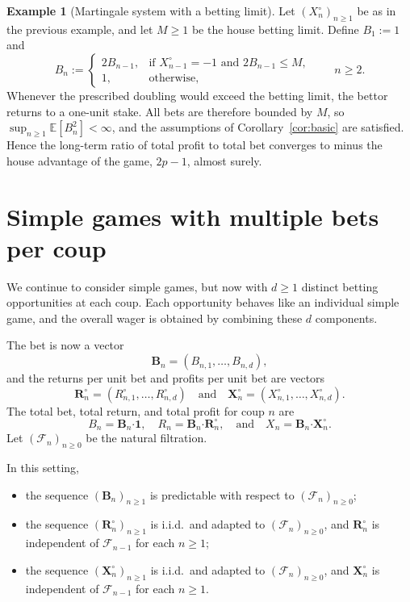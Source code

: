 \documentclass{article}
\theoremstyle{definition}
\newtheorem{example}[theorem]{Example}
\theoremstyle{remark}
\newcommand{\E}{\mathbb{E}}
\newcommand{\F}{\mathscr{F}}
\begin{document}
\begin{example}[Martingale system with a betting limit]
Let $(X_n^\circ)_{n\ge1}$ be as in the previous example, and let $M\ge1$ be the house betting limit.  
Define $B_1:=1$ and
\[
B_n:=
\begin{cases}
2B_{n-1}, &\text{if $X_{n-1}^\circ=-1$ and $2B_{n-1}\le M$},\\[2mm]
1,        &\text{otherwise},
\end{cases}
\qquad n\ge2.
\]
Whenever the prescribed doubling would exceed the betting limit, the bettor returns to a one-unit stake.  
All bets are therefore bounded by $M$, so $\sup_{n \ge 1} \E[B_n^2] < \infty$, and the assumptions of Corollary~\ref{cor:basic} are satisfied.  
Hence the long-term ratio of total profit to total bet converges to minus the house advantage of the game, $2p-1$, almost surely.
\end{example}





\section{Simple games with multiple bets per coup}\label{sec:simple-multiple}

We continue to consider simple games, but now with $d\ge1$ distinct betting opportunities at each coup.  
Each opportunity behaves like an individual simple game, and the overall wager is obtained by combining these $d$ components.

The bet is now a vector
\[
\bm B_n = (B_{n,1},\ldots,B_{n,d}),
\]
and the returns per unit bet and profits per unit bet are vectors
\[
\bm R_n^{\circ}=(R_{n,1}^{\circ},\ldots,R_{n,d}^{\circ})
\quad \text{and}\quad
\bm X_n^{\circ}=(X_{n,1}^{\circ},\ldots,X_{n,d}^{\circ}).
\]
The total bet, total return, and total profit for coup $n$ are
\[
B_n=\bm B_n\bm\cdot\bm1, \quad R_n = \bm B_n \bm\cdot \bm R_n^{\circ},
\quad\text{and}\quad
X_n = \bm B_n\bm\cdot \bm X_n^{\circ}.
\]
Let $(\F_n)_{n\ge 0}$ be the natural filtration.

In this setting,
\begin{itemize}
    \item the sequence $(\bm B_n)_{n\ge1}$ is predictable with respect to $(\F_n)_{n\ge0}$;
    \item the sequence $(\bm R_n^\circ)_{n\ge1}$ is i.i.d.\ and adapted to $(\F_n)_{n\ge0}$, and $\bm R_n^\circ$ is independent of $\F_{n-1}$ for each $n\ge1$;
    \item the sequence $(\bm X_n^\circ)_{n\ge1}$ is i.i.d.\ and adapted to $(\F_n)_{n\ge0}$, and $\bm X_n^\circ$ is independent of $\F_{n-1}$ for each $n\ge1$.
\end{itemize}
\end{document}
